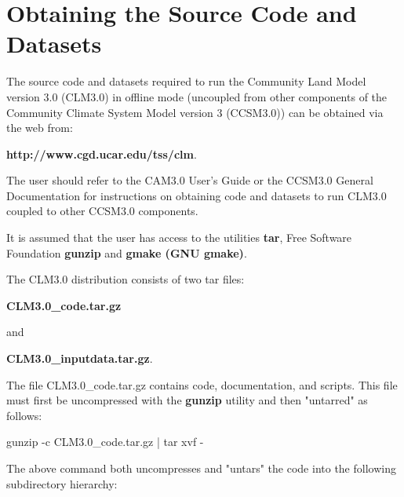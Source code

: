 \section{Obtaining the Source Code and Datasets}

The source code and datasets required to run the Community Land Model
version 3.0 (CLM3.0) in offline mode (uncoupled from other components
of the Community Climate System Model version 3 (CCSM3.0)) can be
obtained via the web from:

\bigskip
{\bf http://www.cgd.ucar.edu/tss/clm}.
\bigskip

The user should refer to the CAM3.0 User's Guide or the CCSM3.0 General
Documentation for instructions on obtaining code and datasets to run CLM3.0
coupled to other CCSM3.0 components.

It is assumed that the user has access to the utilities {\bf tar},
Free Software Foundation {\bf gunzip} and {\bf gmake (GNU gmake)}.

The CLM3.0 distribution consists of two tar files:

\bigskip
{\bf CLM3.0\_code.tar.gz}
\bigskip

and

\bigskip
{\bf CLM3.0\_inputdata.tar.gz}.
\bigskip

The file CLM3.0\_code.tar.gz contains code, documentation, and
scripts. This file must first be uncompressed with the {\bf gunzip}
utility and then "untarred" as follows:

\bigskip
gunzip -c CLM3.0\_code.tar.gz | tar xvf -
\bigskip

The above command both uncompresses and "untars" the code into the
following subdirectory hierarchy:

\bigskip

